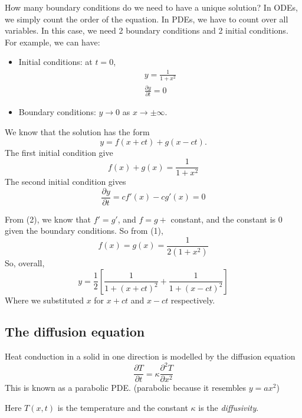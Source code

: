 \documentclass[a4paper]{article}
\begin{document}
How many boundary conditions do we need to have a unique solution? In ODEs, we simply count the order of the equation. In PDEs, we have to count over all variables. In this case, we need 2 boundary conditions and 2 initial conditions. For example, we can have:
\begin{itemize}
\item Initial conditions: at $t = 0$,
  \begin{gather*}
    y = \frac{1}{1 + x^2}\\
    \frac{\partial y}{\partial t} = 0
  \end{gather*}
\item Boundary conditions: $y \to 0$ as $x \to \pm \infty$.
\end{itemize}
We know that the solution has the form 
\[
y = f(x + ct) + g(x - ct).
\]
The first initial condition give
\[
f(x) + g(x) = \frac{1}{1 + x^2}\tag{1}
\]
The second initial condition gives
\[
\frac{\partial y}{\partial t} = cf'(x) - cg'(x)\tag{2} = 0
\]

From (2), we know that $f' = g'$, and $f = g + $ constant, and the constant is $0$ given the boundary conditions. So from (1),
\[
f(x) = g(x) = \frac{1}{2(1 + x^2)}
\]
So, overall,
\[
y = \frac{1}{2}\left[\frac{1}{1 + (x + ct)^2} + \frac{1}{1 + (x - ct)^2}\right]
\]
Where we substituted $x$ for $x +ct$ and $x - ct$ respectively.

\subsection{The diffusion equation}
Heat conduction in a solid in one direction is modelled by the diffusion equation
\[
\frac{\partial T}{\partial t} = \kappa \frac{\partial^2 T}{\partial x^2}
\]
This is known as a parabolic PDE. (parabolic because it resembles $y = ax^2$)

Here $T(x, t)$ is the temperature and the constant $\kappa$ is the \emph{diffusivity}.
\end{document}
